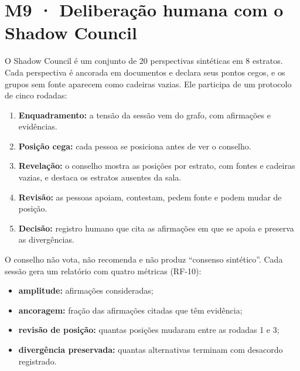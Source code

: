 \documentclass[12pt,a4paper,oneside,english,brazil]{abntex2}
\newcommand{\rf}[1]{{\footnotesize(#1)}}
\begin{document}

\section{M9 · Deliberação humana com o Shadow Council}
O Shadow Council é um conjunto de 20 perspectivas sintéticas em 8 estratos. Cada perspectiva é ancorada em documentos e declara seus pontos cegos, e os grupos sem fonte aparecem como cadeiras vazias. Ele participa de um protocolo de cinco rodadas:

\begin{enumerate}[leftmargin=*, start=0]
  \item \textbf{Enquadramento:} a tensão da sessão vem do grafo, com afirmações e evidências.
  \item \textbf{Posição cega:} cada pessoa se posiciona antes de ver o conselho.
  \item \textbf{Revelação:} o conselho mostra as posições por estrato, com fontes e cadeiras vazias, e destaca os estratos ausentes da sala.
  \item \textbf{Revisão:} as pessoas apoiam, contestam, pedem fonte e podem mudar de posição.
  \item \textbf{Decisão:} registro humano que cita as afirmações em que se apoia e preserva as divergências.
\end{enumerate}

O conselho não vota, não recomenda e não produz ``consenso sintético''. Cada sessão gera um relatório com quatro métricas \rf{RF-10}:
\begin{itemize}[leftmargin=*]
  \item \textbf{amplitude:} afirmações consideradas;
  \item \textbf{ancoragem:} fração das afirmações citadas que têm evidência;
  \item \textbf{revisão de posição:} quantas posições mudaram entre as rodadas 1 e 3;
  \item \textbf{divergência preservada:} quantas alternativas terminam com desacordo registrado.
\end{itemize}
\end{document}
